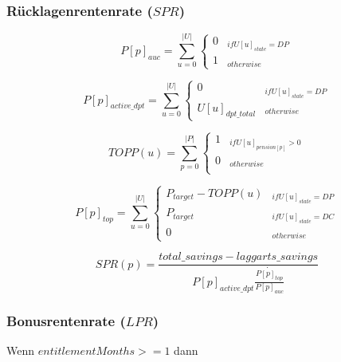 \subsubsection*{Rücklagenrentenrate ($SPR$)}


\begin{equation}
P[p]_{auc} = \sum_{u=0}^{|U|} \begin{cases} 
0 & _{if U[u]_{state} = DP}\\
1 & _{otherwise}
\end{cases}
\end{equation}

\begin{equation}
P[p]_{active\_dpt} = \sum_{u=0}^{|U|} \begin{cases} 
0 & _{if U[u]_{state} = DP}\\
U[u]_{dpt\_total} & _{otherwise}
\end{cases}
\end{equation}

\begin{equation*}
TOPP(u) = \sum_{p=0}^{|P|} \begin{cases}
1 & _{if U[u]_{pension[p]} > 0}\\
0 & _{otherwise}\\
\end{cases}
\end{equation*}



\begin{equation}
P[p]_{top} = \sum_{u=0}^{|U|} \begin{cases} 
P_{target} - TOPP(u)  & _{if U[u]_{state} = DP}\\
P_{target} & _{if U[u]_{state} = DC}\\
0 & _{otherwise}
\end{cases}
\end{equation}

\begin{equation}
SPR(p) = \frac{total\_savings - laggarts\_savings} {P[p]_{active\_dpt} \dot {\frac{P[p]_{top}} {P[p]_{auc}}}
}
\end{equation}


\subsubsection*{Bonusrentenrate ($LPR$)}

Wenn $entitlementMonths >= 1$ dann 

